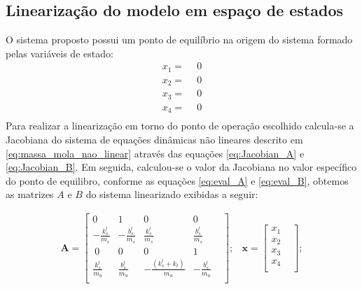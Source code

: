      \subsection{Linearização do modelo em espaço de estados}
        
    O sistema proposto possui um ponto de equilíbrio na origem do sistema formado pelas variáveis de estado:
    \begin{equation*}
        \begin{split}
        x_1=\ \ &0\\
        x_2=\ \ &0\\
        x_3=\ \ &0\\
        x_4=\ \ &0\\
        \end{split}
    \end{equation*}
    Para realizar a linearização em torno do ponto de operação escolhido calcula-se a Jacobiana do sistema de equações dinâmicas não lineares descrito em \ref{eq:massa_mola_nao_linear} através das equações \ref{eq:Jacobian_A} e \ref{eq:Jacobian_B}. Em seguida, calculou-se o valor da Jacobiana no valor específico do ponto de equilibro, conforme as equações \ref{eq:eval_A} e \ref{eq:eval_B}, obtemos as matrizes $A$ e $B$ do sistema linearizado exibidas a seguir:
 
    \begin{equation*} 
    \begin{split}
        \mathbf{A} =
        \begin{bmatrix}
            0 & 1 & 0 & 0 & \\            
            -\frac{k_{s}^{l}}{m_s}&-\frac{b_{s}^{l}}{m_s}&\frac{k_{s}^{l}}{m_s}&\frac{b_{s}^{l}}{m_s} &\\ \  
            0 & 0 & 0 & 1 & \\
            \frac{k_{s}^{l}}{m_u}&\frac{b_{s}^{l}}{m_u}&-\frac{(k_{s}^{l}+k_t)}{m_u}&-\frac{b_{s}^{l}}{m_u} &\\
        \end{bmatrix};
    \end{split}
    \begin{split}
       \mathbf{x} = 
        \begin{bmatrix}
             x_1 &\\
             x_2 &\\
             x_3 &\\
             x_4 &\\
        \end{bmatrix}; 
    \end{split}
    \end{equation*}
    
